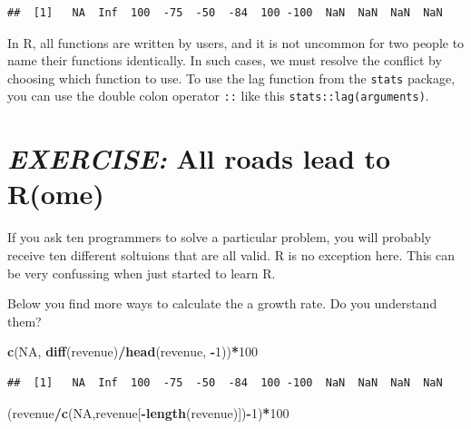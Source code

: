 \documentclass[
  12pt,
  oneside]{book}
\newenvironment{Shaded}{\begin{snugshade}}{\end{snugshade}}
\newcommand{\ConstantTok}[1]{\textcolor[rgb]{0.56,0.35,0.01}{#1}}
\newcommand{\DecValTok}[1]{\textcolor[rgb]{0.00,0.00,0.81}{#1}}
\newcommand{\FunctionTok}[1]{\textcolor[rgb]{0.13,0.29,0.53}{\textbf{#1}}}
\newcommand{\NormalTok}[1]{#1}
\newcommand{\SpecialCharTok}[1]{\textcolor[rgb]{0.81,0.36,0.00}{\textbf{#1}}}
\begin{document}
\begin{verbatim}
##  [1]   NA  Inf  100  -75  -50  -84  100 -100  NaN  NaN  NaN  NaN
\end{verbatim}

In R, all functions are written by users, and it is not uncommon for two people to name their functions identically. In such cases, we must resolve the conflict by choosing which function to use. To use the lag function from the \texttt{stats} package, you can use the double colon operator \texttt{::} like this \texttt{stats::lag(arguments)}.

\hypertarget{exercise-all-roads-lead-to-rome}{%
\section*{\texorpdfstring{\emph{EXERCISE:} All roads lead to R(ome)}{EXERCISE: All roads lead to R(ome)}}\label{exercise-all-roads-lead-to-rome}}

If you ask ten programmers to solve a particular problem, you will probably receive ten different soltuions that are all valid. R is no exception here. This can be very confussing when just started to learn R.

Below you find more ways to calculate the a growth rate. Do you understand them?

\begin{Shaded}
\begin{Highlighting}[]
\FunctionTok{c}\NormalTok{(}\ConstantTok{NA}\NormalTok{, }\FunctionTok{diff}\NormalTok{(revenue)}\SpecialCharTok{/}\FunctionTok{head}\NormalTok{(revenue, }\SpecialCharTok{{-}}\DecValTok{1}\NormalTok{))}\SpecialCharTok{*}\DecValTok{100}        
\end{Highlighting}
\end{Shaded}

\begin{verbatim}
##  [1]   NA  Inf  100  -75  -50  -84  100 -100  NaN  NaN  NaN  NaN
\end{verbatim}

\begin{Shaded}
\begin{Highlighting}[]
\NormalTok{(revenue}\SpecialCharTok{/}\FunctionTok{c}\NormalTok{(}\ConstantTok{NA}\NormalTok{,revenue[}\SpecialCharTok{{-}}\FunctionTok{length}\NormalTok{(revenue)])}\SpecialCharTok{{-}}\DecValTok{1}\NormalTok{)}\SpecialCharTok{*}\DecValTok{100}
\end{Highlighting}
\end{Shaded}
\end{document}
